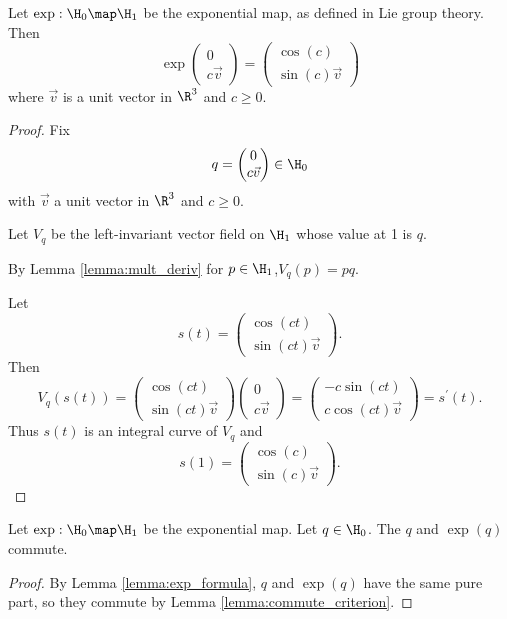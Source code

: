 \documentclass[oneside,12pt]{amsart}
\begin{document}
\begin{lemma}
\label{lemma:exp_formula}
Let $\exp:\H_0\map\H_1$ be the exponential map, as defined in Lie group theory.
Then 
$$\exp
\begin{pmatrix}
0 \\ c\vec{v}
\end{pmatrix}
 = 
\begin{pmatrix}
\cos(c) \\ \sin(c) \vec{v}
\end{pmatrix}
$$
where $\vec{v}$ is a unit vector in $\R^3$ and $c\geq 0$.
\end{lemma}
\begin{proof}
Fix 
$$q=
\begin{pmatrix}
0 \\ c\vec{v}
\end{pmatrix}
\in\H_0$$
with  $\vec{v}$ a unit vector in $\R^3$ and $c\geq 0$.

Let $V_q$ be the left-invariant vector field on $\H_1$ whose value at 1 is $q$.

By Lemma \ref{lemma:mult_deriv}
for $p\in\H_1$,$V_q(p) = pq$. 

Let
$$s(t)=
\begin{pmatrix}
\cos(ct) \\ \sin(ct) \vec{v}
\end{pmatrix}
.
$$
Then
$$V_q(s(t)) = \begin{pmatrix}
\cos(ct) \\ \sin(ct) \vec{v}
\end{pmatrix}
\begin{pmatrix}
0 \\ c \vec{v}
\end{pmatrix} =
\begin{pmatrix}
-c\sin(ct) \\ c \cos(ct)\vec{v}
\end{pmatrix} = s^{\prime}(t).
$$
Thus $s(t)$ is an integral curve of $V_q$ and
$$
s(1)=\begin{pmatrix}
\cos(c) \\ \sin(c) \vec{v}
\end{pmatrix}.
$$
\end{proof}

\begin{corollary}
\label{corollary:exp_commute}
Let $\exp:\H_0\map\H_1$ be the exponential map. Let $q\in\H_0$. The $q$ and $\exp(q)$ commute.
\end{corollary}
\begin{proof}
By Lemma \ref{lemma:exp_formula}, $q$ and $\exp(q)$ have the same pure part,
so they commute by Lemma \ref{lemma:commute_criterion}.
\end{proof}
\end{document}
